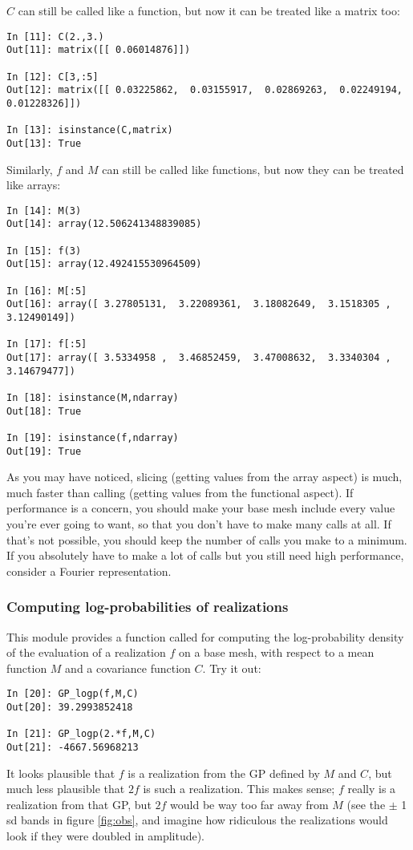 \documentclass{manual}
\begin{document}
$C$ can still be called like a function, but now it can be treated like a matrix too:
\begin{verbatim}
In [11]: C(2.,3.)
Out[11]: matrix([[ 0.06014876]])

In [12]: C[3,:5]
Out[12]: matrix([[ 0.03225862,  0.03155917,  0.02869263,  0.02249194,  0.01228326]])

In [13]: isinstance(C,matrix)
Out[13]: True
\end{verbatim}
Similarly, $f$ and $M$ can still be called like functions, but now they can be treated like arrays:
\begin{verbatim}
In [14]: M(3)
Out[14]: array(12.506241348839085)

In [15]: f(3)
Out[15]: array(12.492415530964509)

In [16]: M[:5]
Out[16]: array([ 3.27805131,  3.22089361,  3.18082649,  3.1518305 ,  3.12490149])

In [17]: f[:5]
Out[17]: array([ 3.5334958 ,  3.46852459,  3.47008632,  3.3340304 ,  3.14679477])

In [18]: isinstance(M,ndarray)
Out[18]: True

In [19]: isinstance(f,ndarray)
Out[19]: True
\end{verbatim}

As you may have noticed, slicing (getting values from the array aspect) is much, much faster than calling (getting values from the functional aspect). If performance is a concern, you should make your base mesh include every value you're ever going to want, so that you don't have to make many calls at all. If that's not possible, you should keep the number of calls you make to a minimum. If you absolutely have to make a lot of calls but you still need high performance, consider a Fourier representation.
 
\subsubsection{Computing log-probabilities of realizations}\label{subsub:logp}
This module provides a function called  for computing the log-probability density of the evaluation of a realization $f$ on a base mesh, with respect to a mean function $M$ and a covariance function $C$. Try it out:
\begin{verbatim}
In [20]: GP_logp(f,M,C)
Out[20]: 39.2993852418

In [21]: GP_logp(2.*f,M,C)
Out[21]: -4667.56968213
\end{verbatim}
It looks plausible that $f$ is a realization from the GP defined by $M$ and $C$, but much less plausible that $2f$ is such a realization. This makes sense; $f$ really is a realization from that GP, but $2f$ would be way too far away from $M$ (see the $\pm$ 1 sd bands in figure \ref{fig:obs}, and imagine how ridiculous the realizations would look if they were doubled in amplitude).
\end{document}

